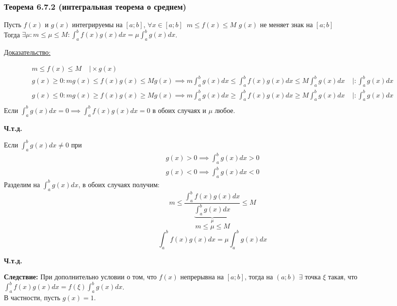 \documentclass[12pt]{article}
\begin{document}
    \subsubsection*{Теорема 6.7.2 (интегральная теорема о среднем)}\label{th:6.7.2}
    Пусть $f(x)$ и $g(x)$ интегрируемы на $[a;b]$, $\forall x \in [a;b]\;\; m \leq f(x) \leq M$ $g(x)$ не меняет знак на $[a;b]$\\
    Тогда $\exists \mu : m\leq \mu \leq M: \int_{a}^{b} f(x)g(x)dx = \mu \int_{a}^{b}g(x)dx$.\par\noindent
    \underline{Доказательство:}
    \begin{adjustwidth}{1.5em}{1.5em}
        \begin{gather*}
            m \leq f(x) \leq M\;\;\;\; \Big| \times g(x)\\
            g(x)\geq 0 : mg(x)\leq f(x)g(x)\leq Mg(x) \implies m \int_{a}^{b} g(x) dx \leq \int_{a}^{b}f(x)g(x)dx \leq M \int_{a}^{b}g(x)dx \;\;\;\; \Big| : \int_{a}^{b} g(x)dx\\
            g(x)\leq 0 : mg(x)\geq f(x)g(x)\geq Mg(x) \implies m \int_{a}^{b} g(x) dx \geq \int_{a}^{b}f(x)g(x)dx \geq M \int_{a}^{b}g(x)dx \;\;\;\; \Big| : \int_{a}^{b} g(x)dx\\
        \end{gather*}
        Если $\int_{a}^{b} g(x)dx = 0 \implies \int_{a}^{b} f(x)g(x)dx =0$ в обоих случаях и $\mu$ любое. 
        \begin{center}
            \textbf{Ч.т.д.}
        \end{center}
        Если $\int_{a}^{b} g(x) dx \ne 0$ при 
        \[ \begin{matrix}
            g(x) > 0 \implies \int_{a}^{b} g(x)dx >0\\
            g(x)<0 \implies \int_{a}^{b} g(x)dx<0
        \end{matrix} \]
        Разделим на $\int_{a}^{b} g(x)dx$, в обоих случаях получим: 
        \[ m \leq \frac{\int_{a}^{b}f(x)g(x)dx}{\underbrace{\int_{a}^{b}g(x)dx}_{\mu}}\leq M \]
        \[ m\leq \mu \leq M \] 
        \[ \int_{a}^{b} f(x)g(x)dx=\mu\int_{a}^{b}g(x)dx \]
        \begin{center}
            \textbf{Ч.т.д.}
        \end{center}
        \textbf{Следствие:} При дополнительно условии о том, что $f(x)$ непрерывна на $[a;b]$, тогда на $(a;b)$ $\exists$ точка $\xi$ такая, что $\int_{a}^{b}f(x)g(x)dx=f(\xi)\int_{a}^{b}g(x)dx$.\\
        В частности, пусть $g(x)=1$.

\end{adjustwidth}
\end{document}
